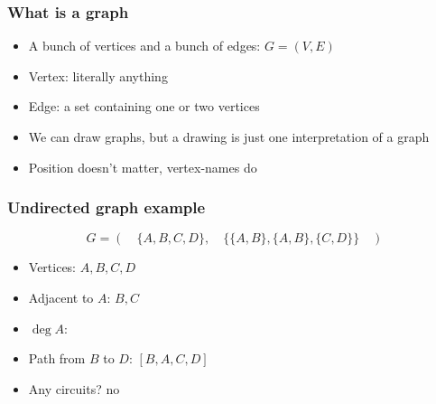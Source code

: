 \begin{frame}
\frametitle{What is a graph}
\begin{itemize}
\pause
\item A bunch of vertices and a bunch of edges: \pause $G = (V, E)$


\pause
\item Vertex: literally anything 

\pause
\item Edge: a set containing one or two vertices 


\pause
\item We can draw graphs, but a drawing is just \alert{one interpretation} of a graph

\pause
\item Position doesn't matter, vertex-names do
\end{itemize}
\end{frame}

\begin{frame}
\frametitle{Undirected graph example}
\begin{example}
$$G = (\quad\{A, B, C, D\}, \quad \{\{A, B\}, \{A, B\}, \{C, D\}\} \quad)$$


\end{example}

\begin{itemize}
\pause
\item Vertices: \pause $A, B, C, D$ 

\pause
\item Adjacent to $A$: \pause $B, C$

\pause
\item $\deg A$:  

\pause
\item Path from $B$ to $D$: \pause $[B, A, C, D]$


\pause
\item Any circuits? \pause no
\end{itemize}
\end{frame}

